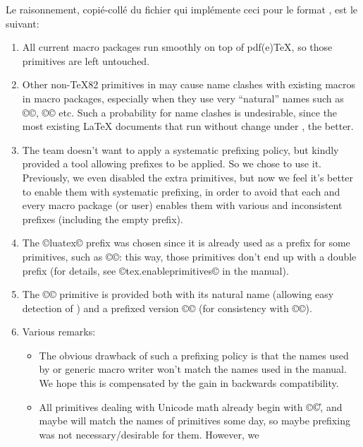 \documentclass{lltxdoc}
\begin{document}
Le raisonnement, copié-collé du fichier  qui implémente
ceci pour le format , est le suivant:

\begin{myquote}
  \begin{enumerate}
    \item All current macro packages run smoothly on top of pdf(e)TeX, so
      those primitives are left untouched.
    \item Other non-TeX82 primitives in \luatex may cause name clashes with
      existing macros in macro packages, especially when they use very
      ``natural'' names such as ©\outputbox©, ©\mathstyle© etc. Such a
      probability for name clashes is undesirable, since the most existing
      LaTeX documents that run without change under \luatex, the better.
    \item The \luatex team doesn't want to apply a systematic prefixing policy,
      but kindly provided a tool allowing prefixes to be applied. So we chose
      to use it.  Previously, we even disabled the extra primitives, but now
      we feel it's better to enable them with systematic prefixing, in order
      to avoid that each and every macro package (or user) enables them with
      various and inconsistent prefixes (including the empty prefix).
    \item The ©luatex© prefix was chosen since it is already used as a prefix
      for some primitives, such as ©\luatexversion©: this way, those
      primitives don't end up with a double prefix (for details, see
      ©tex.enableprimitives© in the \luatex manual).
    \item The ©\directlua© primitive is provided both with its natural name
      (allowing easy detection of \luatex) and a prefixed version
      ©\luatexdirectlua© (for consistency with ©\luatexlatelua©).
    \item Various remarks:
      \begin{itemize}
        \item The obvious drawback of such a prefixing policy is that the
          names used by \latex or generic macro writer won't match the names
          used in the manual.  We hope this is compensated by the gain in
          backwards compatibility.
        \item All primitives dealing with Unicode math already begin with ©\U©,
          and maybe will match the names of \xetex primitives some day, so
          maybe prefixing was not necessary/desirable for them. However, we

\end{itemize}
\end{enumerate}
\end{myquote}
\end{document}
